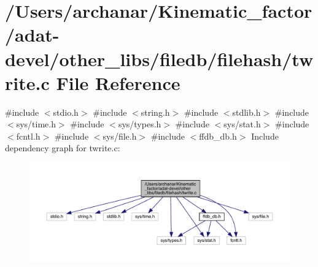 \hypertarget{adat-devel_2other__libs_2filedb_2filehash_2twrite_8c}{}\section{/\+Users/archanar/\+Kinematic\+\_\+factor/adat-\/devel/other\+\_\+libs/filedb/filehash/twrite.c File Reference}
\label{adat-devel_2other__libs_2filedb_2filehash_2twrite_8c}
{\ttfamily \#include $<$stdio.\+h$>$}\newline
{\ttfamily \#include $<$string.\+h$>$}\newline
{\ttfamily \#include $<$stdlib.\+h$>$}\newline
{\ttfamily \#include $<$sys/time.\+h$>$}\newline
{\ttfamily \#include $<$sys/types.\+h$>$}\newline
{\ttfamily \#include $<$sys/stat.\+h$>$}\newline
{\ttfamily \#include $<$fcntl.\+h$>$}\newline
{\ttfamily \#include $<$sys/file.\+h$>$}\newline
{\ttfamily \#include $<$ffdb\+\_\+db.\+h$>$}\newline
Include dependency graph for twrite.\+c\+:
\nopagebreak
\begin{figure}[H]
\begin{center}
\leavevmode
\includegraphics[width=350pt]{df/dd2/adat-devel_2other__libs_2filedb_2filehash_2twrite_8c__incl}
\end{center}
\end{figure}
